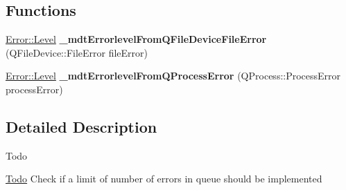 \subsection*{Functions}
\begin{DoxyCompactItemize}
\item 
\hyperlink{class_mdt_1_1_error_ab533dc690f68a8635232db594194a068}{Error\+::\+Level} {\bfseries \+\_\+mdt\+Errorlevel\+From\+Q\+File\+Device\+File\+Error} (Q\+File\+Device\+::\+File\+Error file\+Error)\hypertarget{namespace_mdt_a257b45c35cbeebcdd09e848d0eb32a24}{}\label{namespace_mdt_a257b45c35cbeebcdd09e848d0eb32a24}

\item 
\hyperlink{class_mdt_1_1_error_ab533dc690f68a8635232db594194a068}{Error\+::\+Level} {\bfseries \+\_\+mdt\+Errorlevel\+From\+Q\+Process\+Error} (Q\+Process\+::\+Process\+Error process\+Error)\hypertarget{namespace_mdt_a695a2c868ea594d886deb671f1a12913}{}\label{namespace_mdt_a695a2c868ea594d886deb671f1a12913}

\end{DoxyCompactItemize}


\subsection{Detailed Description}
\begin{DoxyRefDesc}{Todo}
\item[\hyperlink{todo__todo000001}{Todo}]Check if a limit of number of errors in queue should be implemented \end{DoxyRefDesc}
